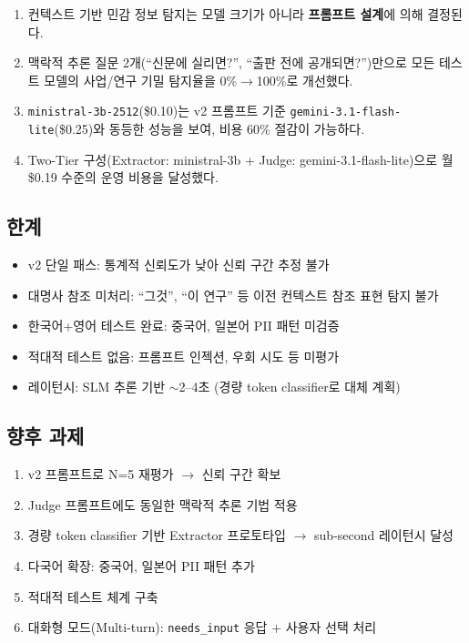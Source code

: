 \documentclass[11pt,a4paper]{article}
\begin{document}
\begin{enumerate}[nosep]
  \item 컨텍스트 기반 민감 정보 탐지는 모델 크기가 아니라 \textbf{프롬프트 설계}에 의해 결정된다.
  \item 맥락적 추론 질문 2개(``신문에 실리면?'', ``출판 전에 공개되면?'')만으로 모든 테스트 모델의 사업/연구 기밀 탐지율을 0\%$\rightarrow$100\%로 개선했다.
  \item \texttt{ministral-3b-2512}(\$0.10)는 v2 프롬프트 기준 \texttt{gemini-3.1-flash-lite}(\$0.25)와 동등한 성능을 보여, 비용 60\% 절감이 가능하다.
  \item Two-Tier 구성(Extractor: ministral-3b + Judge: gemini-3.1-flash-lite)으로 월 \$0.19 수준의 운영 비용을 달성했다.
\end{enumerate}

\subsection{한계}

\begin{itemize}[nosep]
  \item v2 단일 패스: 통계적 신뢰도가 낮아 신뢰 구간 추정 불가
  \item 대명사 참조 미처리: ``그것'', ``이 연구'' 등 이전 컨텍스트 참조 표현 탐지 불가
  \item 한국어+영어 테스트 완료: 중국어, 일본어 PII 패턴 미검증
  \item 적대적 테스트 없음: 프롬프트 인젝션, 우회 시도 등 미평가
  \item 레이턴시: SLM 추론 기반 $\sim$2--4초 (경량 token classifier로 대체 계획)
\end{itemize}

\subsection{향후 과제}

\begin{enumerate}[nosep]
  \item v2 프롬프트로 N=5 재평가 $\rightarrow$ 신뢰 구간 확보
  \item Judge 프롬프트에도 동일한 맥락적 추론 기법 적용
  \item 경량 token classifier 기반 Extractor 프로토타입 $\rightarrow$ sub-second 레이턴시 달성
  \item 다국어 확장: 중국어, 일본어 PII 패턴 추가
  \item 적대적 테스트 체계 구축
  \item 대화형 모드(Multi-turn): \texttt{needs\_input} 응답 + 사용자 선택 처리
\end{enumerate}
\end{document}
